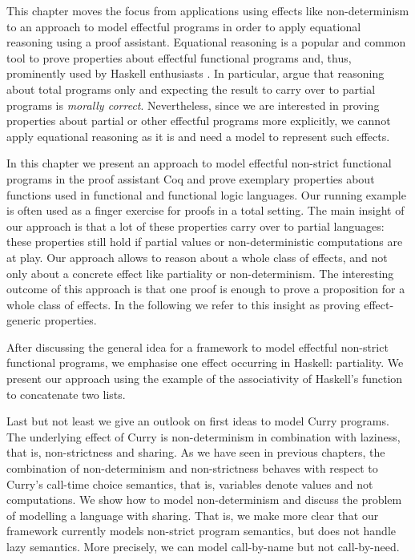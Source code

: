 
This chapter moves the focus from applications using effects like non\--determinism to an approach to model effectful programs in order to apply equational reasoning using a proof assistant.
Equational reasoning is a popular and common tool to prove properties about effectful functional programs and, thus, prominently used by Haskell enthusiasts \citep{jeuring2012testing, gibbons2011just, hutton2008reasoning}.
In particular, \citet{danielsson2006fast} argue that reasoning about total programs only and expecting the result to carry over to partial programs is \textit{morally correct}.
Nevertheless, since we are interested in proving properties about partial or other effectful programs more explicitly, we cannot apply equational reasoning as it is and need a model to represent such effects.

In this chapter we present an approach to model effectful non\--strict functional programs in the proof assistant Coq and prove exemplary properties about functions used in functional and functional logic languages.
Our running example is often used as a finger exercise for proofs in a total setting.
The main insight of our approach is that a lot of these properties carry over to partial languages: these properties still hold if partial values or non\--deterministic computations are at play.
Our approach allows to reason about a whole class of effects, and not only about a concrete effect like partiality or non\--determinism.
The interesting outcome of this approach is that one proof is enough to prove a proposition for a whole class of effects.
In the following we refer to this insight as proving effect\--generic properties.

After discussing the general idea for a framework to model effectful non\--strict functional programs, we emphasise one effect occurring in Haskell: partiality.
We present our approach using the example of the associativity of Haskell's function  to concatenate two lists.

Last but not least we give an outlook on first ideas to model Curry programs.
The underlying effect of Curry is non\--determinism in combination with laziness, that is, non\--strictness and sharing.
As we have seen in previous chapters, the combination of non\--determinism and non\--strictness behaves with respect to Curry's call\--time choice semantics, that is, variables denote values and not computations.
We show how to model non\--determinism and discuss the problem of modelling a language with sharing.
That is, we make more clear that our framework currently models non\--strict program semantics, but does not handle lazy semantics.
More precisely, we can model call\--by\--name but not call\--by\--need.

